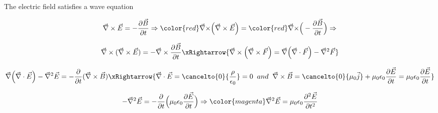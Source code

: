 \begin{frame}{The electric field satisfies a wave equation}

\begin{equation*}
  \vec{\nabla} \times \vec{E} = -\frac{\partial \vec{B}}{\partial t} \Rightarrow
  {\color{red} \vec{\nabla} \times} \Big( \vec{\nabla} \times \vec{E} \Big) =
  {\color{red} \vec{\nabla} \times} \Big( -\frac{\partial \vec{B}}{\partial t} \Big) \Rightarrow
\end{equation*}

\begin{equation*}
  \vec{\nabla} \times (\vec{\nabla} \times \vec{E}) =
  - \vec{\nabla} \times \frac{\partial \vec{B}}{\partial t}
  \xRightarrow{ \vec{\nabla} \times \Big( \vec{\nabla} \times \vec{F} \Big) =
                \vec{\nabla} \Big( \vec{\nabla} \cdot \vec{F} \Big) - \vec{\nabla}^{2} \vec{F} }
\end{equation*}

\begin{equation*}
  \vec{\nabla} \Big( \vec{\nabla} \cdot \vec{E} \Big) - \vec{\nabla}^{2} \vec{E} =
  - \frac{\partial}{\partial t} (\vec{\nabla} \times \vec{B})
  \xRightarrow{
      \vec{\nabla} \cdot \vec{E} = \cancelto{0}{\frac{\rho}{\epsilon_0}} = 0
       \;\; and \;\;
      \vec{\nabla} \times \vec{B} =
           \cancelto{0}{\mu_0 \vec{j}} +\mu_0 \epsilon_0 \frac{\partial \vec{E}}{\partial t} =
           \mu_0 \epsilon_0 \frac{\partial \vec{E}}{\partial t}
  }
\end{equation*}

\begin{equation*}
  - \vec{\nabla}^{2} \vec{E} =
  - \frac{\partial}{\partial t} \Big( \mu_0 \epsilon_0 \frac{\partial \vec{E}}{\partial t} \Big)
  \Rightarrow
  {\color{magenta}
     \vec{\nabla}^{2} \vec{E} =
     \mu_0 \epsilon_0 \frac{\partial^{2} \vec{E}}{\partial t^{2}}
  }
\end{equation*}

\end{frame}


%
%
%
%

